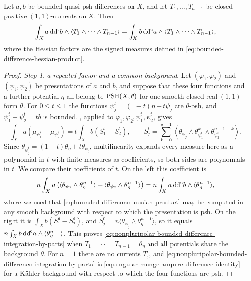 \begin{theorem}\label{thm:nonpluripolar-bounded-difference-integration-by-parts}
Let $a,b$ be bounded quasi-psh differences on $X$, and let $T_1,\ldots,T_{n-1}$ be closed positive $(1,1)$-currents on $X$. Then
\begin{equation}\label{eq:nonpluripolar-bounded-difference-integration-by-parts}
 \int_Xa\,\mathrm{dd}^{\mathrm{c}} b\wedge\langle T_1\wedge\cdots\wedge T_{n-1}\rangle
       =\int_Xb\,\mathrm{dd}^{\mathrm{c}} a\wedge\langle T_1\wedge\cdots\wedge T_{n-1}\rangle,
\end{equation}
where the Hessian factors are the signed measures defined in \eqref{eq:bounded-difference-hessian-product}.
\end{theorem}
\begin{proof}
\emph{Step 1: a repeated factor and a common background.} Let $(\varphi_1,\varphi_2)$ and $(\psi_1,\psi_2)$ be presentations of $a$ and $b$, and suppose that these four functions and a further potential $\eta$ all belong to $\mathrm{PSH}(X,\theta)$ for one smooth closed real $(1,1)$-form $\theta$. For $0\leq t\leq1$ the functions $\psi_j^t=(1-t)\eta+t\psi_j$ are $\theta$-psh, and $\psi_1^t-\psi_2^t=tb$ is bounded. , applied to $\varphi_1,\varphi_2,\psi_1^t,\psi_2^t$, gives
\[
 \int_Xa(\mu_{\psi_1^t}-\mu_{\psi_2^t})=t\int_Xb(S_1^t-S_2^t),
 \qquad
 S_j^t=\sum_{k=0}^{n-1}\left\langle\theta_{\varphi_j}\wedge\theta_{\psi_1^t}^k\wedge\theta_{\psi_2^t}^{n-1-k}\right\rangle.
\]
Since $\theta_{\psi_j^t}=(1-t)\theta_\eta+t\theta_{\psi_j}$, multilinearity expands every measure here as a polynomial in $t$ with finite measures as coefficients, so both sides are polynomials in $t$. We compare their coefficients of $t$. On the left this coefficient is
\[
 n\int_Xa\left(\langle\theta_{\psi_1}\wedge\theta_\eta^{n-1}\rangle-\langle\theta_{\psi_2}\wedge\theta_\eta^{n-1}\rangle\right)
 =n\int_Xa\,\mathrm{dd}^{\mathrm{c}} b\wedge\langle\theta_\eta^{n-1}\rangle,
\]
where we used that \eqref{eq:bounded-difference-hessian-product} may be computed in any smooth background with respect to which the presentation is psh. On the right it is $\int_Xb(S_1^0-S_2^0)$, and $S_j^0=n\langle\theta_{\varphi_j}\wedge\theta_\eta^{n-1}\rangle$, so it equals $n\int_Xb\,\mathrm{dd}^{\mathrm{c}} a\wedge\langle\theta_\eta^{n-1}\rangle$. This proves \eqref{eq:nonpluripolar-bounded-difference-integration-by-parts} when $T_1=\cdots=T_{n-1}=\theta_\eta$ and all potentials share the background $\theta$. For $n=1$ there are no currents $T_j$, and \eqref{eq:nonpluripolar-bounded-difference-integration-by-parts} is \eqref{eq:singular-monge-ampere-difference-identity} for a K\"ahler background with respect to which the four functions are psh.


\end{proof}
